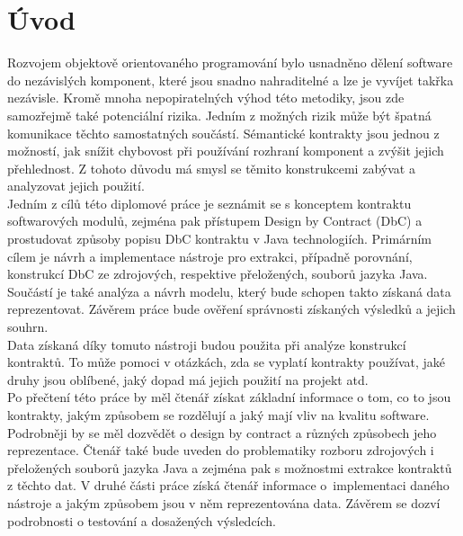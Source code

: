 \chapter{Úvod}

Rozvojem objektově orientovaného programování bylo usnadněno dělení software do nezávislých komponent, které jsou snadno nahraditelné a lze je vyvíjet takřka nezávisle. Kromě mnoha nepopiratelných výhod této metodiky, jsou zde samozřejmě také potenciální rizika. Jedním z možných rizik může být špatná komunikace těchto samostatných součástí. Sémantické kontrakty jsou jednou z možností, jak snížit chybovost při používání rozhraní komponent a zvýšit jejich přehlednost. Z tohoto důvodu má smysl se těmito konstrukcemi zabývat a analyzovat jejich použití.\\

Jedním z cílů této diplomové práce je seznámit se s konceptem kontraktu softwarových modulů, zejména pak přístupem Design by Contract (DbC) a prostudovat způsoby popisu DbC kontraktu v Java technologiích. Primárním cílem je návrh a implementace nástroje pro extrakci, případně porovnání, konstrukcí DbC ze zdrojových, respektive přeložených, souborů jazyka Java. Součástí je také analýza a návrh modelu, který bude schopen takto získaná data reprezentovat. Závěrem práce bude ověření správnosti získaných výsledků a jejich souhrn.\\ 

Data získaná díky tomuto nástroji budou použita při analýze konstrukcí kontraktů. To může pomoci v otázkách, zda se vyplatí kontrakty používat, jaké druhy jsou oblíbené, jaký dopad má jejich použití na projekt atd.\\

Po přečtení této práce by měl čtenář získat základní informace o tom, co to jsou kontrakty, jakým způsobem se rozdělují a jaký mají vliv na kvalitu software. Podrobněji by se měl dozvědět o design by contract a různých způsobech jeho reprezentace. Čtenář také bude uveden do problematiky rozboru zdrojových i přeložených souborů jazyka Java a zejména pak s možnostmi extrakce kontraktů z těchto dat. V druhé části práce získá čtenář informace o~implementaci daného nástroje a jakým způsobem jsou v něm reprezentována data. Závěrem se dozví podrobnosti o testování a dosažených výsledcích.
